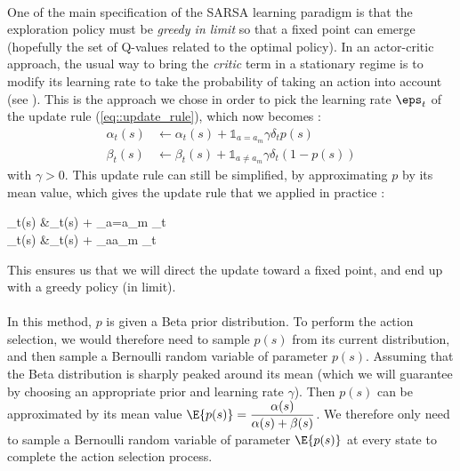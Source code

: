 \documentclass[a4paper]{report}
\begin{document}
{{{{				\paragraph{} One of the main specification of the SARSA learning paradigm is that the exploration policy must be \emph{greedy in limit} so that a fixed point can emerge (hopefully the set of Q-values related to the optimal policy). In an actor-critic approach, the usual way to bring the \emph{critic} term in a stationary regime is to modify its learning rate to take the probability of taking an action into account (see \cite{Sutton98a}). \newline
				This is the approach we chose in order to pick the learning rate $\eps_t$ of the update rule (\ref{eq::update_rule}), which now becomes : 
			\begin{equation}
				\begin{aligned}
					\alpha_t(s) &\leftarrow \alpha_t(s) +  \mathds{1}_{a=a_m}\gamma \delta_t p(s)\\
					\beta_t(s) &\leftarrow \beta_t(s) +   \mathds{1}_{a\neq a_m}\gamma \delta_t (1-p(s))
				\end{aligned}
			\end{equation}
			with $\gamma >0$. This update rule can still be simplified, by approximating $p$ by its mean value, which gives the update rule that we applied in practice : 
			{
				\begin{aligned}
					\alpha_t(s) &\leftarrow \alpha_t(s) +  _{a=a_m} \delta_t \\
					\beta_t(s) &\leftarrow \beta_t(s) +   _{a\neq a_m}  \delta_t
				\end{aligned}
			}
			This ensures us that we will direct the update toward a fixed point, and end up with a greedy policy (in limit). 
			
			\paragraph{} In this method, $p$ is given a Beta prior distribution. To perform the action selection, we would therefore need to sample $p(s)$ from its current distribution, and then sample a Bernoulli random variable of parameter $p(s)$. Assuming that the Beta distribution is sharply peaked around its mean (which we will guarantee by choosing an appropriate prior and learning rate $\gamma$). Then $p(s)$ can be approximated by its mean value $\E{p(s)} = \displaystyle\frac{\alpha(s)}{\alpha(s) + \beta(s)}$. We therefore only need to sample a Bernoulli random variable of parameter $\E{p(s)}$ at every state to complete the action selection process. 
			
}}}}
\end{document}
